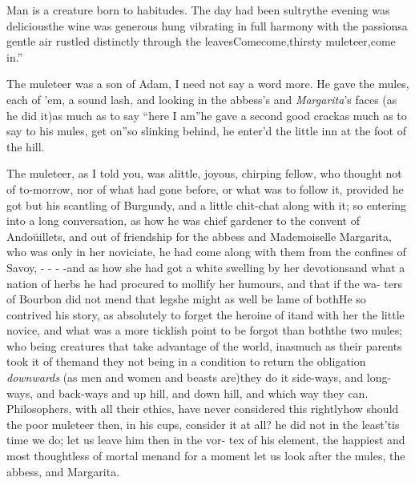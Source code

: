 \documentclass{article}
\begin{document}
Man is a creature born to habitudes. The day had been
sultry\tsk the evening was delicious\tsk the wine was
generous\tsk\break{}
hung vibrating in full harmony with the
passions\tsk a gentle air rustled distinctly through the
leaves\tsk \lqq Come\tsk come,\break\lqq thirsty
muleteer,\tsk come in.”

\tsh The muleteer was a son of Adam, I need not say a
word more. He gave the mules, each of ’em, a sound lash,\break
and looking in the abbess’s and \textit{Margarita}’s faces
(as he did it)\tsk as much as to say “here I
am”\tsk he gave a second good\break
crack\tsk as much as to say to his mules,
\lqq get on”\tsh so slinking behind,
he enter’d the little inn at the foot of the hill.

The muleteer, as I told you, was a\break little, joyous,
chirping fellow, who thought not of to-morrow, nor of what had
gone before, or what was to follow it, provided he got but his
scantling of Burgundy, and a little chit-chat along with it; so
entering into a long conversation, as how he was chief gardener
to the convent of Andoüillets, \etc\etc and out of friendship
for the abbess and Mademoiselle Margarita, who was only in her
noviciate, he had come along with them from the confines of
Savoy, \etc - - \etc- -\break and as how she had got a white
swelling by her devotions\tsk and what a nation of herbs he had
procured to mollify her humours, \etc\etc and that if the wa-
ters of Bourbon did not mend that leg\tsk she might as well be
lame of both\tsk \etc\etc\etc\tsk He so contrived his story, as
absolutely to forget the heroine of it\tsk and with her the
little novice, and what was a more ticklish point to be forgot
than both\tsk the two mules; who being creatures that take
advantage of the world, inasmuch as their parents took it of
them\tsk and they not being in a condition to return the
obligation \textit{downwards} (as men and women and beasts
are)\tsk they do it side-ways, and long-ways, and back-ways\tsk
and up hill, and down hill, and which way they can.\tsk
Philosophers, with all their ethics, have never considered this
rightly\tsk how should the poor muleteer then, in his cups,
consider it at all? he did not in the least\tsk ’tis time we do;
let us leave him then in the vor- tex of his element, the happiest
and most thoughtless of mortal men\tsk and for a moment let us
look after the mules, the abbess, and Margarita.
\end{document}
